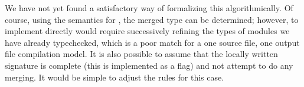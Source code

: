 We have not yet found a satisfactory way of formalizing this
algorithmically.  Of course, using the semantics for \OldBackpack{}, the
merged type can be determined; however, to implement \OldBackpack{}
directly would require successively refining the types of modules we
have already typechecked, which is a poor match for a one source file,
one output file compilation model.  It is also possible to assume
that the locally written signature is complete (this is implemented
as a flag) and not attempt to do any merging.  It would be simple to
adjust the rules for this case.
